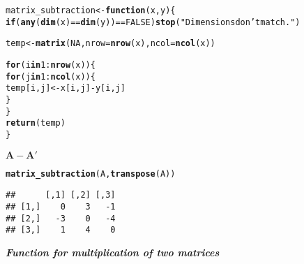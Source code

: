 \documentclass[11pt, a4paper]{article}\usepackage[]{graphicx}\usepackage[]{xcolor}
\makeatletter
\newcommand{\hlnum}[1]{\textcolor[rgb]{0.686,0.059,0.569}{#1}}%
\newcommand{\hlsng}[1]{\textcolor[rgb]{0.192,0.494,0.8}{#1}}%
\newcommand{\hlopt}[1]{\textcolor[rgb]{0,0,0}{#1}}%
\newcommand{\hldef}[1]{\textcolor[rgb]{0.345,0.345,0.345}{#1}}%
\newcommand{\hlkwa}[1]{\textcolor[rgb]{0.161,0.373,0.58}{\textbf{#1}}}%
\newcommand{\hlkwb}[1]{\textcolor[rgb]{0.69,0.353,0.396}{#1}}%
\newcommand{\hlkwc}[1]{\textcolor[rgb]{0.333,0.667,0.333}{#1}}%
\newcommand{\hlkwd}[1]{\textcolor[rgb]{0.737,0.353,0.396}{\textbf{#1}}}%
\newenvironment{kframe}{%
 \def\at@end@of@kframe{}%
 \ifinner\ifhmode%
  \def\at@end@of@kframe{\end{minipage}}%
  \begin{minipage}{\columnwidth}%
 \fi\fi%
 \def\FrameCommand##1{\hskip\@totalleftmargin \hskip-\fboxsep
 \colorbox{shadecolor}{##1}\hskip-\fboxsep
     \hskip-\linewidth \hskip-\@totalleftmargin \hskip\columnwidth}%
 \MakeFramed {\advance\hsize-\width
   \@totalleftmargin\z@ \linewidth\hsize
   \@setminipage}}%
 {\par\unskip\endMakeFramed%
 \at@end@of@kframe}
\newenvironment{knitrout}{}{} %
\makeatother
\begin{document}
\begin{knitrout}
\color{fgcolor}\begin{kframe}
\begin{alltt}
\hldef{matrix_subtraction} \hlkwb{<-} \hlkwa{function}\hldef{(}\hlkwc{x}\hldef{,} \hlkwc{y}\hldef{)\{}
  \hlkwa{if}\hldef{(}\hlkwd{any}\hldef{(}\hlkwd{dim}\hldef{(x)} \hlopt{==} \hlkwd{dim}\hldef{(y))} \hlopt{==} \hlnum{FALSE}\hldef{)} \hlkwd{stop}\hldef{(}\hlsng{"Dimensions don't match."}\hldef{)}

  \hldef{temp} \hlkwb{<-} \hlkwd{matrix}\hldef{(}\hlnum{NA}\hldef{,} \hlkwc{nrow} \hldef{=} \hlkwd{nrow}\hldef{(x),} \hlkwc{ncol} \hldef{=} \hlkwd{ncol}\hldef{(x))}

  \hlkwa{for} \hldef{(i} \hlkwa{in} \hlnum{1}\hlopt{:}\hlkwd{nrow}\hldef{(x)) \{}
    \hlkwa{for} \hldef{(j} \hlkwa{in} \hlnum{1}\hlopt{:}\hlkwd{ncol}\hldef{(x)) \{}
      \hldef{temp[i, j]} \hlkwb{<-} \hldef{x[i, j]} \hlopt{-} \hldef{y[i, j]}
    \hldef{\}}
  \hldef{\}}
  \hlkwd{return}\hldef{(temp)}
\hldef{\}}
\end{alltt}
\end{kframe}
\end{knitrout}

\faArrowAltCircleRight[regular] $\mathbf{A - A'}$

\begin{knitrout}
\color{fgcolor}\begin{kframe}
\begin{alltt}
\hlkwd{matrix_subtraction}\hldef{(A,} \hlkwd{transpose}\hldef{(A))}
\end{alltt}
\begin{verbatim}
##      [,1] [,2] [,3]
## [1,]    0    3   -1
## [2,]   -3    0   -4
## [3,]    1    4    0
\end{verbatim}
\end{kframe}
\end{knitrout}

\faArrowAltCircleRight[regular] \textit{\textbf{Function for multiplication of two matrices}}
\end{document}
